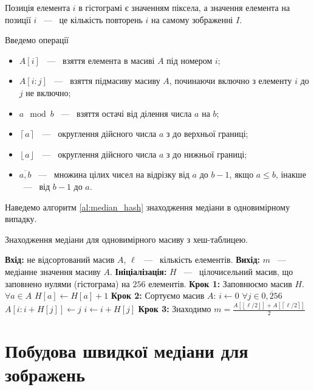 Позиція елемента $i$ в гістограмі є значенням піксела, а значення елемента на позиції $i$ ~---~ це
кількість повторень $i$ на самому зображенні $I$.

Введемо операції
\begin{itemize}
    \item $A[i]$ ~---~ взяття елемента в масиві $A$ під номером $i$;
    \item $A[i:j]$ ~---~ взяття підмасиву масиву $A$, починаючи включно з елементу $i$ до $j$ не включно;
    \item $a \mod b$ ~---~ взяття остачі від ділення числа $a$ на $b$;
    \item $\left\lceil a \right\rceil$ ~---~ округлення дійсного числа $a$ з до верхньої границі;
    \item $\left\lfloor a \right\rfloor$ ~---~ округлення дійсного числа $a$ з до нижньої границі;
    \item $\overline{a,b}$ ~---~ множина цілих чисел на відрізку від $a$ до $b-1$, якщо $a \le b$,
          інакше  ~---~ від $b-1$ до $a$.
\end{itemize}
Наведемо алгоритм \ref{al:median_hash} знаходження медіани в одновимірному випадку.

\begin{algorithm}[H]
    \caption{Знаходження медіани для одновимірного масиву з хеш-таблицею.}
    \begin{algorithmic}
        \State \textbf{Вхід:} не відсортований масив $A$, $\ell$ ~---~ кількість елементів.
        \State \textbf{Вихід:} $m$ ~---~ медіанне значення масиву $A$.
        \State \textbf{Ініціалізація:} $H$ ~---~ цілочисельний масив, що заповнено нулями (гістограма) на $256$ елементів.
        \State \textbf{Крок 1:} Заповнюємо масив $H$.
        \State $\forall a \in A$
        \State \qquad $ H[a] \gets H[a] + 1 $
        \State \textbf{Крок 2:} Сортуємо масив $ A $:
        \State $ i \gets 0 $
        \State $ \forall j \in \overline{0,256} $
        \State \qquad  $ A[i:i+H[j]] \gets j $
        \State \qquad  $ i \gets i + H[j] $
        \State \textbf{Крок 3:} Знаходимо $m = \frac{A[  \left\lfloor \ell/2 \right\rfloor   ] + A[\left\lceil \ell/2 \right\rceil ]}{2} $
    \end{algorithmic}
    \label{al:median_hash}
\end{algorithm}

\section{Побудова швидкої медіани для зображень}

